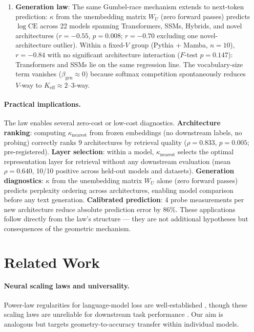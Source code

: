 \documentclass{article}
\begin{document}
\begin{enumerate}
\item \textbf{Generation law}: The same Gumbel-race mechanism extends to next-token prediction: $\kappa$ from the unembedding matrix $W_U$ (zero forward passes) predicts $\log\mathrm{CE}$ across 22 models spanning Transformers, SSMs, Hybrids, and novel architectures ($r=-0.55$, $p=0.008$; $r=-0.70$ excluding one novel-architecture outlier). Within a fixed-$V$ group (Pythia + Mamba, $n=10$), $r=-0.84$ with no significant architecture interaction ($F$-test $p=0.147$): Transformers and SSMs lie on the same regression line. The vocabulary-size term vanishes ($\beta_\mathrm{gen}\approx 0$) because softmax competition spontaneously reduces $V$-way to $K_\mathrm{eff}\approx 2$--$3$-way.
\end{enumerate}

\paragraph{Practical implications.}
The law enables several zero-cost or low-cost diagnostics.
\textbf{Architecture ranking}: computing $\kappa_\mathrm{nearest}$ from frozen embeddings (no downstream labels, no probing) correctly ranks 9 architectures by retrieval quality ($\rho=0.833$, $p=0.005$; pre-registered).
\textbf{Layer selection}: within a model, $\kappa_\mathrm{nearest}$ selects the optimal representation layer for retrieval without any downstream evaluation (mean $\rho=0.640$, 10/10 positive across held-out models and datasets).
\textbf{Generation diagnostics}: $\kappa$ from the unembedding matrix $W_U$ alone (zero forward passes) predicts perplexity ordering across architectures, enabling model comparison before any text generation.
\textbf{Calibrated prediction}: 4 probe measurements per new architecture reduce absolute prediction error by 86\%.
These applications follow directly from the law's structure --- they are not additional hypotheses but consequences of the geometric mechanism.

\section{Related Work}

\paragraph{Neural scaling laws and universality.}
Power-law regularities for language-model loss are well-established \citep{kaplan2020,hoffmann2022}, though these scaling laws are unreliable for downstream task performance \citep{lourie2025scaling}. Our aim is analogous but targets geometry-to-accuracy transfer within individual models.
\end{document}
